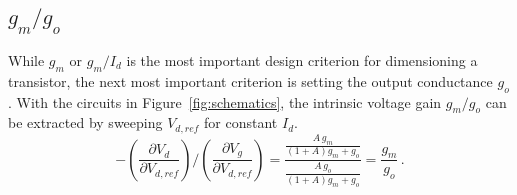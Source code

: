\documentclass[journal]{IEEEtran}
\def\le{\left}
\def\ri{\right}
\begin{document}
\subsection{$g_m/g_o$}
%
While $g_m$ or $g_m/I_d$ is the most important design criterion for dimensioning a transistor,
the next most important criterion is setting the output conductance $g_o$. 
With the circuits in Figure~\ref{fig:schematics}, 
the intrinsic voltage gain $g_m/g_o$ can be extracted by sweeping $V_{d,ref}$ for constant $I_d$.
\begin{equation}\label{egn:gm_over_go}
-\le(\frac{\partial V_d}{\partial V_{d,ref}}\ri)
/\le(\frac{\partial V_g}{\partial V_{d,ref}}\ri)
= \frac{\frac{A\,g_m}{\le(1+A\ri)g_m+g_o}}{\frac{A\,g_o}{\le(1+A\ri)g_m+g_o}} 
= \frac{g_m}{g_o} \,.
\end{equation}
\end{document}
